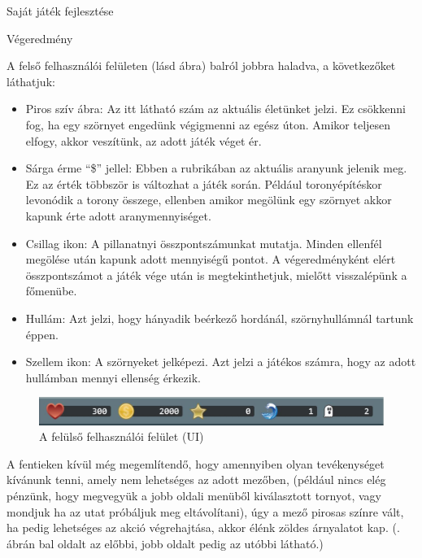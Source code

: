 \begin{MyChapter}{Saját játék fejlesztése}
\begin{MySection}{Végeredmény}
	
		A felső felhasználói felületen (lásd  ábra) balról jobbra haladva, a következőket láthatjuk:
		
		\begin{itemize}
			\item Piros szív ábra: Az itt látható szám az aktuális életünket jelzi. Ez csökkenni fog, ha egy szörnyet engedünk végigmenni az egész úton. Amikor teljesen elfogy, akkor veszítünk, az adott játék véget ér.
			
			\item Sárga érme ``\$'' jellel: Ebben a rubrikában az aktuális aranyunk jelenik meg. Ez az érték többször is változhat a játék során. Például toronyépítéskor levonódik a torony összege, ellenben amikor megölünk egy szörnyet akkor kapunk érte adott aranymennyiséget.
			
			\item Csillag ikon: A pillanatnyi összpontszámunkat mutatja. Minden ellenfél megölése után kapunk adott mennyiségű pontot. A végeredményként elért összpontszámot a játék vége után is megtekinthetjuk, mielőtt visszalépünk a főmenübe.
			
			\item Hullám: Azt jelzi, hogy hányadik beérkező hordánál, szörnyhullámnál tartunk éppen.
			
			\item Szellem ikon: A szörnyeket jelképezi. Azt jelzi a játékos számra, hogy az adott hullámban mennyi ellenség érkezik.
		\end{itemize}
	
		\begin{figure}[H]
			\centering
			\includegraphics[scale=0.575]{kepek/jatekHasznalat/felso_ui}
			\caption{A felülső felhasználói felület (UI) }
			\label{fig:jatekHasznalat:felso_ui}
		\end{figure}
	
		A fentieken kívül még megemlítendő, hogy amennyiben olyan tevékenységet kívánunk tenni, amely nem lehetséges az adott mezőben, (például nincs elég pénzünk, hogy megvegyük a jobb oldali menüből kiválasztott tornyot, vagy mondjuk ha az utat próbáljuk meg eltávolítani), úgy a mező pirosas színre vált, ha pedig lehetséges az akció végrehajtása, akkor élénk zöldes árnyalatot kap. (. ábrán bal oldalt az előbbi, jobb oldalt pedig az utóbbi látható.)
		

\end{MySection}
\end{MyChapter}
